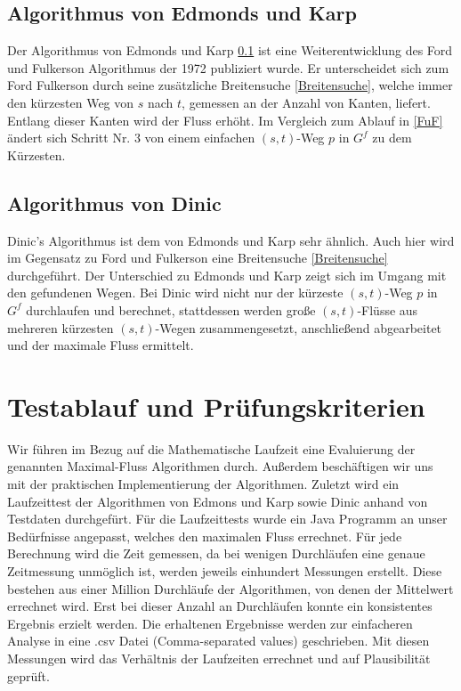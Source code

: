 \documentclass[a4paper]{llncs}
\begin{document}
\subsection{Algorithmus von Edmonds und Karp}
\label{EuK}
Der Algorithmus von Edmonds und Karp \ref{EuK} ist eine Weiterentwicklung des Ford und Fulkerson Algorithmus der 1972 publiziert wurde.
Er unterscheidet sich zum Ford Fulkerson durch seine zusätzliche Breitensuche \ref{Breitensuche},
welche immer den kürzesten Weg von $s$ nach $t$, gemessen an der Anzahl von Kanten, liefert. 
Entlang dieser Kanten wird der Fluss erhöht.
Im Vergleich zum Ablauf in \ref{FuF} ändert sich Schritt Nr. 3 von einem einfachen $(s, t)$-Weg $p$ in $G^{f}$ zu dem Kürzesten.

\subsection{Algorithmus von Dinic}
\label{Dinic}
Dinic's Algorithmus ist dem von Edmonds und Karp sehr ähnlich. Auch hier wird im Gegensatz zu Ford und Fulkerson eine Breitensuche \ref{Breitensuche} durchgeführt. Der Unterschied zu Edmonds und Karp zeigt sich im Umgang mit den gefundenen Wegen. Bei Dinic wird nicht nur der kürzeste $(s, t)$-Weg $p$ in $G^{f}$ durchlaufen und berechnet, stattdessen werden große $(s, t)$-Flüsse aus mehreren kürzesten $(s, t)$-Wegen zusammengesetzt, anschließend abgearbeitet und der maximale Fluss ermittelt.

\section{Testablauf und Prüfungskriterien}
\label{Inhalt}
Wir führen im Bezug auf die Mathematische Laufzeit eine Evaluierung der genannten Maximal-Fluss Algorithmen durch. Außerdem beschäftigen wir uns mit der praktischen Implementierung der Algorithmen. Zuletzt wird ein Laufzeittest der Algorithmen von Edmons und Karp sowie Dinic anhand von Testdaten durchgefürt.
Für die Laufzeittests wurde ein Java Programm an unser Bedürfnisse angepasst, welches den maximalen Fluss errechnet. 
Für jede Berechnung wird die Zeit gemessen, da bei wenigen Durchläufen eine genaue Zeitmessung unmöglich ist, werden jeweils einhundert Messungen erstellt. Diese bestehen aus einer Million Durchläufe der Algorithmen, von denen der Mittelwert errechnet wird.
Erst bei dieser Anzahl an Durchläufen konnte ein konsistentes Ergebnis erzielt werden.
Die erhaltenen Ergebnisse werden zur einfacheren Analyse in eine .csv Datei (Comma-separated values) geschrieben.
Mit diesen Messungen wird das Verhältnis der Laufzeiten errechnet und auf Plausibilität geprüft.
\end{document}
